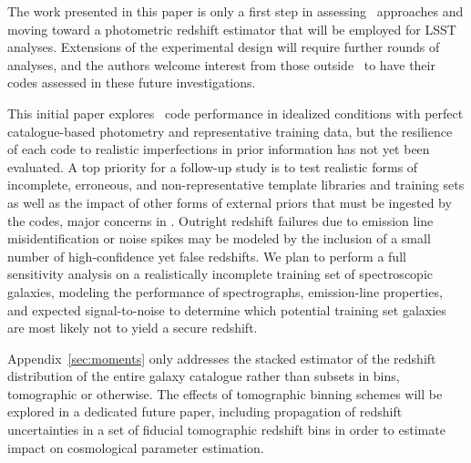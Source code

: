 
The work presented in this paper is only a first step in assessing \pzpdf\ approaches and moving toward a photometric redshift estimator that will be employed for LSST analyses.  Extensions of the experimental design will require further rounds of analyses, and the authors welcome interest from those outside \lsstdesc\ to have their codes assessed in these future investigations.

This initial paper explores \pzpdf\ code performance in idealized conditions with perfect catalogue-based photometry and representative training data, but the resilience of each code to realistic imperfections in prior information has not yet been evaluated.
A top priority for a follow-up study is to test realistic forms of incomplete, erroneous, and non-representative template libraries and training sets as well as the impact of other forms of external priors that must be ingested by the codes, major concerns in \citet{Newman:2015, Masters:2017}.
Outright redshift failures due to emission line misidentification or noise spikes may be modeled by the inclusion of a small number of high-confidence yet false redshifts.
We plan to perform a full sensitivity analysis on a realistically incomplete training set of spectroscopic galaxies, modeling the performance of spectrographs, emission-line properties, and expected signal-to-noise to determine which potential training set galaxies are most likely not to yield a secure redshift.

Appendix~\ref{sec:moments} only addresses the stacked estimator of the redshift distribution of the entire galaxy catalogue rather than subsets in bins, tomographic or otherwise.
The effects of tomographic binning schemes will be explored in a dedicated future paper, including propagation of redshift uncertainties in a set of fiducial tomographic redshift bins in order to estimate impact on cosmological parameter estimation.

